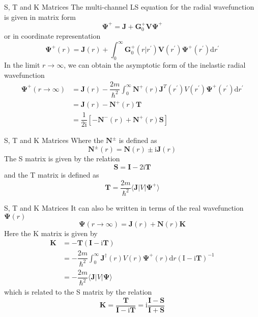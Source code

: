\documentclass{beamer}
\begin{document}
	\begin{frame}{S, T and K Matrices}
		The multi-channel LS equation for the radial wavefunction is given in matrix form
		\begin{equation}
			\mathbf{\Psi}^+=\mathbf{J}+\mathbf{G}_0^+\mathbf{V\Psi}^+
		\end{equation}
		or in coordinate representation
		\begin{equation}
			\mathbf{\Psi}^+(r)=\mathbf{J}(r)+\int_0^\infty \mathbf{G}_0^+(r|r^\prime)\mathbf{V}(r^\prime)\mathbf{\Psi}^+(r^\prime)\mathrm{d}r^\prime
		\end{equation}
		In the limit $r\rightarrow\infty$, we can obtain the asymptotic form of the inelastic radial wavefunction
		\begin{align}
			\mathbf{\Psi}^+(r\rightarrow\infty)&=\mathbf{J}(r)-\dfrac{2m}{\hbar^2}\int_0^\infty\mathbf{N}^+(r)\mathbf{J}^T(r^\prime)V(r^\prime)\mathbf{\Psi}^+(r^\prime)\mathrm{d}r^\prime\nonumber\\
			&=\mathbf{J}(r)-\mathbf{N}^+(r)\mathbf{T}\nonumber\\
			&=\dfrac{1}{2\mathrm{i}}[-\mathbf{N}^-(r)+\mathbf{N}^+(r)\mathbf{S}]
		\end{align}
	\end{frame}
	\begin{frame}{S, T and K Matrices}
		Where the $\mathbf{N}^\pm$ is defined as
		\begin{equation}
			\mathbf{N}^\pm(r)=\mathbf{N}(r)\pm\mathrm{i}\mathbf{J}(r)
		\end{equation}
		The S matrix is given by the relation
		\begin{equation}
			\mathbf{S}=\mathbf{I}-2\mathrm{i}\mathbf{T}
		\end{equation}
		and the T matrix is defined as
		\begin{equation}
			\mathbf{T}=\dfrac{2m}{\hbar^2}\langle\mathbf{J}|V|\mathbf{\Psi}^+\rangle
		\end{equation}
	\end{frame}
	\begin{frame}{S, T and K Matrices}
		It can also be written in terms of the real wavefunction $\mathbf{\Psi}(r)$
		\begin{equation}
			\mathbf{\Psi}(r\rightarrow\infty)=\mathbf{J}(r)+\mathbf{N}(r)\mathbf{K}
		\end{equation}
		Here the K matrix is given by
		\begin{align}
			\mathbf{K}&=-\mathbf{T}(\mathbf{I}-\mathrm{i}\mathbf{T})\nonumber\\
			&=-\dfrac{2m}{\hbar^2}\int_0^\infty \mathbf{J}^\dagger(r)V(r)\mathbf{\Psi^+}(r)\mathrm{d}r(\mathrm{I}-\mathrm{i}\mathbf{T})^{-1}\nonumber\\
			&=-\dfrac{2m}{\hbar^2}\langle\mathbf{J}|V|\mathbf{\Psi}\rangle
		\end{align}
		which is related to the S matrix by the relation
		\begin{equation}
			\mathbf{K}=\dfrac{\mathbf{T}}{\mathbf{I}-\mathrm{i}\mathbf{T}}=\mathrm{i}\dfrac{\mathbf{I}-\mathbf{S}}{\mathbf{I}+\mathbf{S}}
		\end{equation}
	\end{frame}
\end{document}
